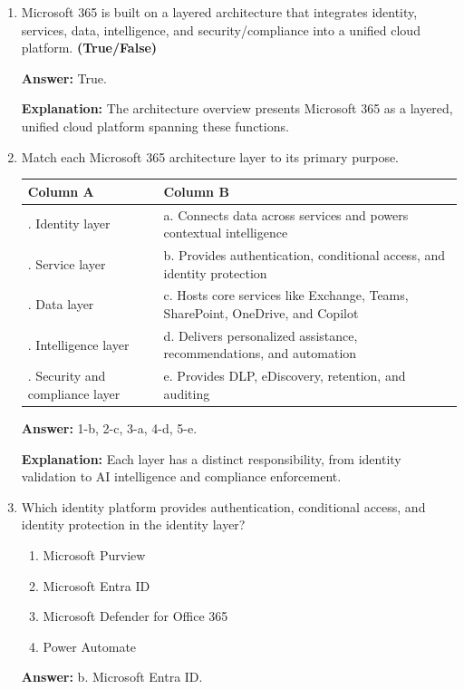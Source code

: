 \documentclass[10pt]{article}
\begin{document}
\begin{enumerate}[leftmargin=*]
\textbf{Explanation:} These services are identified as the core components examined in this subsection.

\item Microsoft 365 is built on a layered architecture that integrates identity, services, data, intelligence, and security/compliance into a unified cloud platform. \textbf{(True/False)}

\textbf{Answer:} True.

\textbf{Explanation:} The architecture overview presents Microsoft 365 as a layered, unified cloud platform spanning these functions.

\item Match each Microsoft 365 architecture layer to its primary purpose.

\begin{center}
\begin{tabular}{>{\raggedright\arraybackslash}p{} >{\raggedright\arraybackslash}p{}}
\toprule
\textbf{Column A} & \textbf{Column B} \\
\midrule
1. Identity layer & a. Connects data across services and powers contextual intelligence \\
2. Service layer & b. Provides authentication, conditional access, and identity protection \\
3. Data layer & c. Hosts core services like Exchange, Teams, SharePoint, OneDrive, and Copilot \\
4. Intelligence layer & d. Delivers personalized assistance, recommendations, and automation \\
5. Security and compliance layer & e. Provides DLP, eDiscovery, retention, and auditing \\
\bottomrule
\end{tabular}
\end{center}

\textbf{Answer:} 1-b, 2-c, 3-a, 4-d, 5-e.

\textbf{Explanation:} Each layer has a distinct responsibility, from identity validation to AI intelligence and compliance enforcement.

\item Which identity platform provides authentication, conditional access, and identity protection in the identity layer?
\begin{enumerate}[label=\alph*., leftmargin=1.5em]
\item Microsoft Purview
\item Microsoft Entra ID
\item Microsoft Defender for Office 365
\item Power Automate
\end{enumerate}
\textbf{Answer:} b. Microsoft Entra ID.


\end{enumerate}
\end{document}
